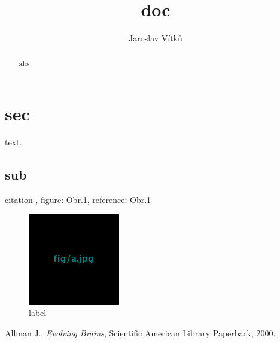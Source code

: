 \documentclass[journal,onecolumn]{IEEEtrancz}
\begin{document}
\title{ doc }
\author{Jaroslav Vítků}

\maketitle

\begin{abstract}
	abs 
\end{abstract}

\IEEEpeerreviewmaketitle




\section{sec}
text..

\subsection{sub}
citation \cite{kniha}, figure: Obr.\ref{a}, reference: Obr.\ref{a} 

\begin{figure}[ht]
	\centering
		\includegraphics[width=4.0cm]{fig/a.jpg}
	\caption{label}
	\label{a}
\end{figure}





\begin{literatura}{1}

Allman J.: \emph{Evolving Brains}, Scientific American Library Paperback, 2000.
\end{literatura}
\end{document}
